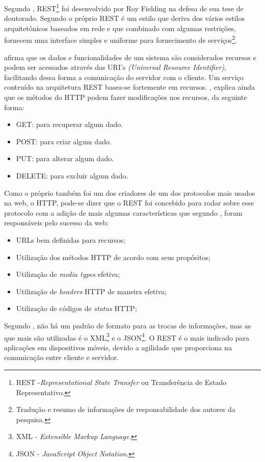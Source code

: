 	
	\par Segundo , REST\footnote{REST
-\textit{Representational State Transfer} ou Transferência de Estado
Representativo.} foi desenvolvido por Roy Fielding na defesa de sua tese de
doutorado. Segundo o próprio  REST é um estilo que
deriva dos vários estilos arquitetônicos baseados em rede e  que combinado com
algumas restrições, fornecem uma interface simples e uniforme para fornecimento
de serviços\footnote{Tradução e resumo de informações de responsabilidade dos
autores da pesquisa.}.
			
	\par {} afirma que os dados e funcionalidades de um sistema
são considerados recursos e podem ser acessados através das URI's
\textit{(Universal Resource Identifier)}, facilitando dessa forma a comunicação
do servidor com o cliente. Um serviço contruído na arquitetura REST basea-se
fortemente em recursos. , explica ainda que os métodos
do HTTP podem fazer modificações nos recursos, da seguinte forma:
	
	\begin{itemize}
		\item GET: para recuperar algum dado. 
		\item POST: para criar algum dado.
		\item PUT: para alterar algum dado. 
		\item DELETE: para excluir algum dado. 
	\end{itemize}

	\par Como o próprio  também foi um dos criadores de
um dos protocolos mais usados na web, o HTTP, pode-se dizer que o REST foi
concebido para rodar sobre esse protocolo com a adição de mais algumas
características que segundo , foram responsáveis pelo
sucesso da web:
		
	\begin{itemize}
		\item URLs bem definidas para recursos;
		\item Utilização dos métodos HTTP de acordo com seus propósitos;
		\item Utilização de \textit{media types} efetiva;
		\item Utilização de \textit{headers} HTTP de maneira efetiva;
		\item Utilização de códigos de \textit{status} HTTP;
	\end{itemize}
			 
	\par Segundo , não há um padrão de formato para as
 trocas de informações, mas as que mais são utilizadas é o XML\footnote{XML
 - \textit{Extensible Markup Language}.} e o JSON\footnote{JSON - 
 \textit{JavaScript Object Notation}.}. O REST é o mais indicado para aplicações
 em dispositivos móveis, devido a agilidade que proporciona na comunicação
 entre cliente e servidor.
